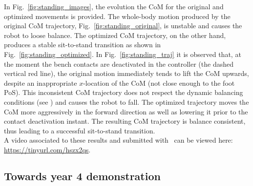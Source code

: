 \documentclass[12pt,a4paper,twoside]{article}
\begin{document}
In Fig.~\ref{fig:standing_images},  the evolution the CoM for the original and optimized movements is provided. The whole-body motion produced by the original CoM trajectory, Fig.~\ref{fig:standing_original}, is unstable and causes the robot to loose balance. The optimized CoM trajectory, on the other hand, produces a stable sit-to-stand transition as shown in Fig.~\ref{fig:standing_optimized}. In Fig.~\ref{fig:standing_traj} it is observed that, at the moment the bench contacts are deactivated in the controller (the dashed vertical red line), the original motion immediately tends to lift the CoM upwards, despite an inappropriate $x$-location of the CoM (not close enough to the foot PoS). This inconsistent CoM trajectory does not respect the dynamic balancing conditions (see \cite{Perrin2015}) and causes the robot to fall.%
The optimized trajectory moves the CoM more aggressively in the forward direction as well as lowering it prior to the contact deactivation instant. The resulting CoM trajectory is balance consistent, thus leading to a successful sit-to-stand transition.\\

A video associated to these results and submitted with~\underline{\bf \cite{lober2017RAL-IROS}} can be viewed here: \url{https://tinyurl.com/hszx2qs}.

\subsection{Towards year 4 demonstration}
\end{document}
